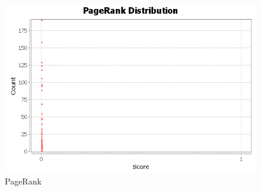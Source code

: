 \documentclass[a4paper,12pt]{article}
\begin{document}
\begin{figure}
\center
\includegraphics[width=\linewidth]{pageranks.png} 
\caption{PageRank}
\end{figure}
\end{document}
